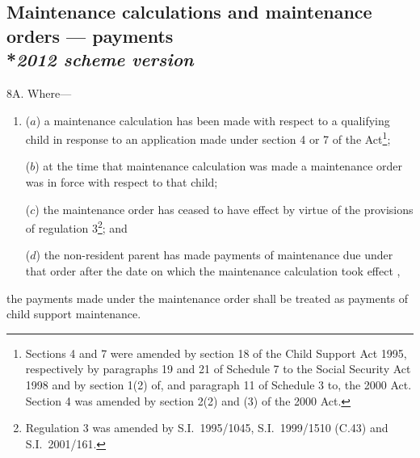 \documentclass[12pt,a4paper]{article}
\begin{document}

\subsection[8A. Maintenance calculations and maintenance orders --- payments --- \emph{2012 scheme version}]{\sloppy Maintenance calculations and maintenance orders --- payments\\*\emph{2012 scheme version}}

8A.  Where—
\begin{enumerate}\item[]
($a$) a maintenance calculation has been made with respect to a qualifying child in response to an application made under section 4 or 7 of the Act\footnote{Sections 4 and 7 were amended by section 18 of the Child Support Act 1995, respectively by paragraphs 19 and 21 of Schedule 7 to the Social Security Act 1998 and by section 1(2) of, and paragraph 11 of Schedule 3 to, the 2000 Act. Section 4 was amended by section 2(2) and (3) of the 2000 Act.};

($b$) at the time that maintenance calculation was made a maintenance order was in force with respect to that child;

($c$) the maintenance order has ceased to have effect by virtue of the provisions of regulation 3\footnote{Regulation 3 was amended by S.I.\ 1995/1045, S.I.\ 1999/1510 (C.43) and S.I.\ 2001/161.}; and

($d$) the non-resident parent has made payments of maintenance due under that order after the date on which the maintenance calculation took effect%
,
\end{enumerate}
the payments made under the maintenance order shall be treated as payments of child support maintenance.

\end{document}
